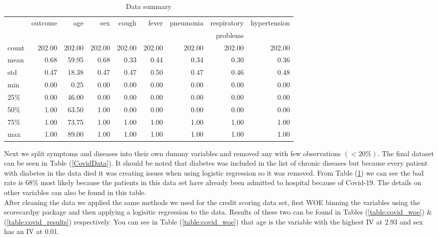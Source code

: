 \begin{table}[H]
	\begin{tabular}{lrrrrrrrr}
	\toprule
	{} &  outcome &     age &     sex &   cough &   fever &  pneumonia &  respiratory &  hypertension \\
	{} & {} & {} & {} & {} & {} & {} & problems & {} \\
	\midrule
	count &   202.00 &  202.00 &  202.00 &  202.00 &  202.00 &     202.00 &                202.00 &        202.00 \\
	mean  &     0.68 &   59.95 &    0.68 &    0.33 &    0.44 &       0.34 &                  0.30 &          0.36 \\
	std   &     0.47 &   18.38 &    0.47 &    0.47 &    0.50 &       0.47 &                  0.46 &          0.48 \\
	min   &     0.00 &    0.25 &    0.00 &    0.00 &    0.00 &       0.00 &                  0.00 &          0.00 \\
	25\%   &     0.00 &   46.00 &    0.00 &    0.00 &    0.00 &       0.00 &                  0.00 &          0.00 \\
	50\%   &     1.00 &   63.50 &    1.00 &    0.00 &    0.00 &       0.00 &                  0.00 &          0.00 \\
	75\%   &     1.00 &   73.75 &    1.00 &    1.00 &    1.00 &       1.00 &                  1.00 &          1.00 \\
	max   &     1.00 &   89.00 &    1.00 &    1.00 &    1.00 &       1.00 &                  1.00 &          1.00 \\
	\bottomrule
	\end{tabular}
	\caption{Data summary \label{table:covid_data_sum}}
\end{table}

Next we split symptoms and diseases into their own dummy variables and removed any with few observations $( < 20\% )$. The final dataset can be seen in Table (\ref{CovidData}). It should be noted that diabetes was included in the list of chronic diseases but because every patient with diabetes in the data died it was creating issues when using logistic regression so it was removed. From Table (\ref{table:covid_data_sum}) we can see the bad rate is 68\% most likely because the patients in this data set have already been admitted to hospital because of Covid-19. The details on other variables can also be found in this table.\\

After cleaning the data we applied the same methods we used for the credit scoring data set, first WOE binning the variables using the scorecardpy package and then applying a logisitic regression to the data. Results of these two can be found in Tables (\ref{table:covid_woe}) \& (\ref{table:covid_results}) respectively. You can see in Table (\ref{table:covid_woe}) that age is the variable with the highest IV at 2.93 and sex has an IV at 0.01. \\

